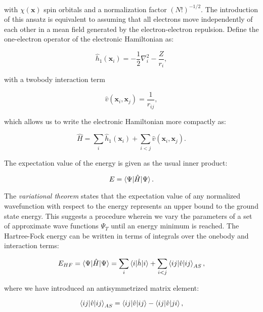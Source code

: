 with $\chi(\bm{x})$ spin orbitals and a normalization factor
$(N!)^{-1/2}$. The introduction of this ansatz is equivalent to assuming that
all electrons move independently of each other
in a mean field generated by the electron-electron repulsion.
Define the one-electron operator of the electronic Hamiltonian as:

\begin{equation}
 \hat{h}_1(\bm{x}_i) = -\frac{1}{2} \nabla_i^2
    -\frac{Z}{r_i} , 
\end{equation}

with a twobody interaction term

\begin{equation}
 \hat{v}(\bm{x}_i, \bm{x}_j) = \frac{1}{r_{ij}} , 
\end{equation}

which allows us to write the electronic Hamiltonian more compactly as:

\begin{equation}
 \hat{H} = \sum_i \hat{h}_1(\bm{x}_i)
    + \sum_{i < j} \hat{v}(\bm{x}_i, \bm{x}_j) .
\end{equation}

The expectation value of the energy is given as the usual inner product:

\begin{equation}
 E = \braket{\Psi | \hat{H} | \Psi} .
\end{equation}

The \textit{variational theorem} states that the expectation
value of any normalized wavefunction with respect to the energy
represents an upper bound to the ground state energy.
This suggests a procedure wherein we vary the parameters
of a set of approximate wave functions $\Psi_T$
until an energy minimum is reached.
The Hartree-Fock energy can be written in terms of integrals
over the onebody and interaction terms:

\begin{equation}
    E_{HF} = \braket{\Psi | \hat{H} | \Psi} = \sum_i \braket{i | \hat{h} | i}
    + \sum_{i < j} \braket{ij | \hat{v} | ij}_{AS} ,
\end{equation}

where we have introduced an antisymmetrized matrix element:

\begin{equation}
 \braket{ij | \hat{v} | ij}_{AS}
    = \braket{ij | \hat{v} | ij} - \braket{ij | \hat{v} | ji} , 
\end{equation}

